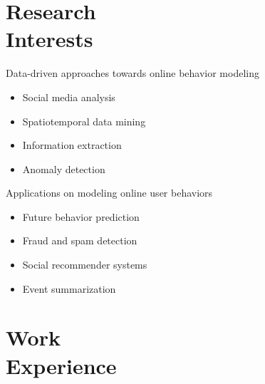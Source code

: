 \documentclass[margin, 9pt]{res}
\begin{document}
\begin{resume}

\section{Research \\ Interests}

Data-driven approaches towards online behavior modeling
\vspace{-0.12in}
\begin{multicols}{2}
\begin{itemize}
\item Social media analysis
\item Spatiotemporal data mining
\item Information extraction
\item Anomaly detection
\end{itemize}
\end{multicols}
\vspace{-0.3in}
Applications on modeling online user behaviors
\vspace{-0.12in}
\begin{multicols}{2}
\begin{itemize}
\item Future behavior prediction
\item Fraud and spam detection
\item Social recommender systems
\item Event summarization 
\end{itemize}
\end{multicols}


\section{Work \\ Experience}


\end{resume}
\end{document}
